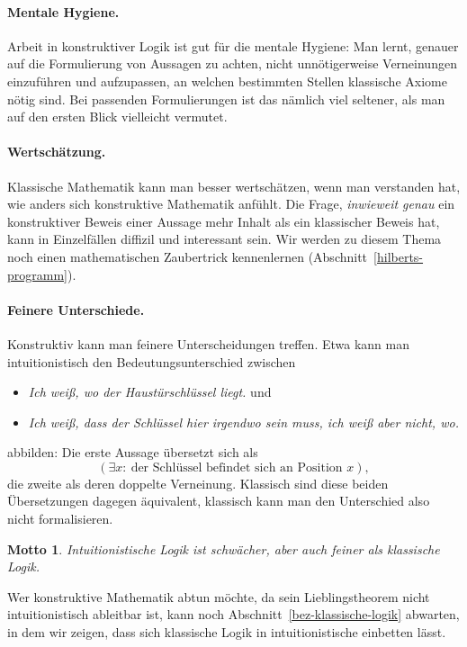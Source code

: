 \documentclass[a4paper,ngerman,12pt]{scrartcl}
\theoremstyle{definition}
\theoremstyle{plain}
\newtheorem{motto}[defn]{Motto}
\theoremstyle{remark}
\renewcommand{\_}{\mathpunct{.}\,}
\newcommand{\?}{\,{:}\,}
\begin{document}
\paragraph{Mentale Hygiene.} Arbeit in konstruktiver Logik ist gut für die
mentale Hygiene: Man lernt, genauer auf die Formulierung von Aussagen zu
achten, nicht unnötigerweise Verneinungen einzuführen und aufzupassen, an
welchen bestimmten Stellen klassische Axiome nötig sind. Bei passenden
Formulierungen ist das nämlich viel seltener, als man auf den ersten Blick
vielleicht vermutet.

\paragraph{Wertschätzung.} Klassische Mathematik kann man besser wertschätzen,
wenn man verstanden hat, wie anders sich konstruktive Mathematik anfühlt.
Die Frage, \emph{inwieweit genau} ein konstruktiver Beweis einer Aussage mehr
Inhalt als ein klassischer Beweis hat, kann in Einzelfällen diffizil und
interessant sein. Wir werden zu diesem Thema noch einen mathematischen
Zaubertrick kennenlernen (Abschnitt~\ref{hilberts-programm}).

\paragraph{Feinere Unterschiede.} Konstruktiv kann man feinere Unterscheidungen
treffen. Etwa kann man intuitionistisch den Bedeutungsunterschied zwischen
\begin{itemize}
\item \emph{Ich weiß, wo der Haustürschlüssel liegt.} und
\item \emph{Ich weiß, dass der Schlüssel hier irgendwo sein muss, ich weiß aber
nicht, wo.}
\end{itemize}
abbilden: Die erste Aussage übersetzt sich als
\[ (\exists x{:}\ \text{der Schlüssel befindet sich an Position~$x$}), \]
die zweite als deren doppelte Verneinung. Klassisch sind diese beiden
Übersetzungen dagegen äquivalent, klassisch kann man den Unterschied also nicht
formalisieren.

\begin{motto}Intuitionistische Logik ist schwächer, aber auch feiner als
klassische Logik.\end{motto}

Wer konstruktive Mathematik abtun möchte, da sein Lieblingstheorem nicht
intuitionistisch ableitbar ist, kann noch Abschnitt~\ref{bez-klassische-logik}
abwarten, in dem wir zeigen, dass sich klassische Logik in intuitionistische
einbetten lässt.
\end{document}
